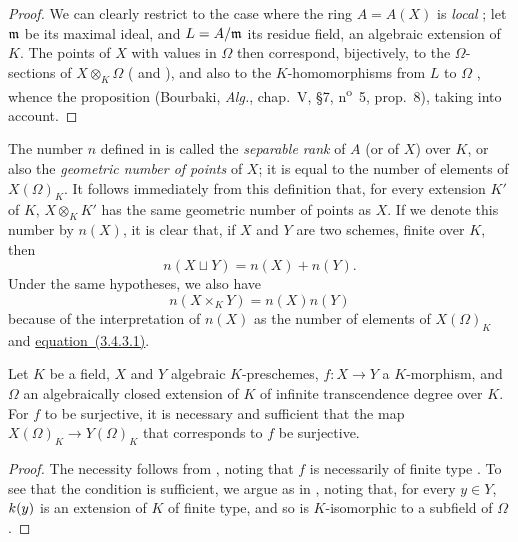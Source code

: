 \begin{proof}
\label{proof-1.6.4.7}
We can clearly restrict to the case where the ring $A=A(X)$ is \emph{local} ;
let $\mathfrak{m}$ be its maximal ideal, and $L=A/\mathfrak{m}$ its residue field, an algebraic extension of $K$.
The points of $X$ with values in $\Omega$ then correspond, bijectively, to the $\Omega$-sections of $X\otimes_K\Omega$ ( and ), and also to the $K$-homomorphisms from $L$ to $\Omega$ , whence the proposition (Bourbaki, \emph{Alg.}, chap.~V, §7, n\textsuperscript{o}~5, prop.~8), taking  into account.
\end{proof}

\begin{env}[6.4.8]
\label{1.6.4.8}
The number $n$ defined in  is called the \emph{separable rank} of $A$ (or of $X$) over $K$, or also the \emph{geometric number of points} of $X$;
it is equal to the number of elements of $X(\Omega)_K$.
It follows immediately from this definition that, for every extension $K'$ of $K$, $X\otimes_K K'$ has the same geometric number of points as $X$.
If we denote this number by $n(X)$, it is clear that, if $X$ and $Y$ are two schemes, finite over $K$, then
\[
    n(X\sqcup Y)=n(X)+n(Y).\tag{6.4.8.1}
\]
Under the same hypotheses, we also have
\[
    n(X\times_K Y)=n(X)n(Y)\tag{6.4.8.2}
\]
because of the interpretation of $n(X)$ as the number of elements of $X(\Omega)_K$ and \hyperref[1.3.4.3]{equation~(3.4.3.1)}.
\end{env}

\begin{prop}[6.4.9]
\label{1.6.4.9}
Let $K$ be a field, $X$ and $Y$ algebraic $K$-preschemes, $f:X\to Y$ a $K$-morphism, and $\Omega$ an algebraically closed extension of $K$ of infinite transcendence degree over $K$.
For $f$ to be surjective, it is necessary and sufficient that the map $X(\Omega)_K\to Y(\Omega)_K$ that corresponds to $f$  be surjective.
\end{prop}

\begin{proof}
\label{proof-1.6.4.9}
The necessity follows from , noting that $f$ is necessarily of finite type .
To see that the condition is sufficient, we argue as in , noting that, for every $y\in Y$, $k(y)$ is an extension of $K$ of finite type, and so is $K$-isomorphic to a subfield of $\Omega$.
\end{proof}

